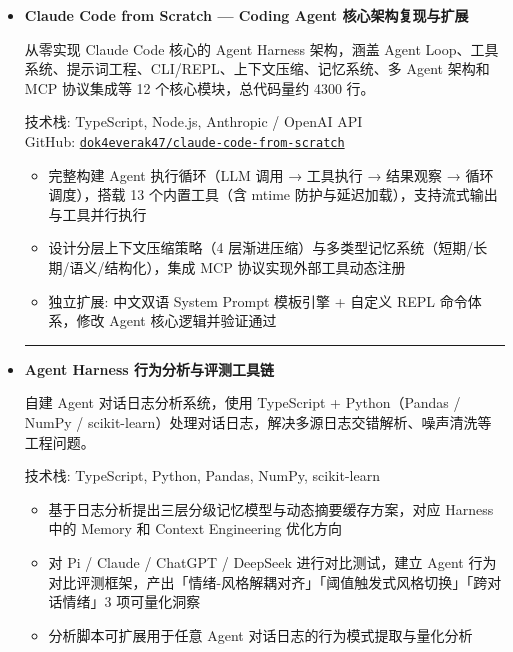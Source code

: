 \documentclass[zh]{resume}
\begin{document}
\begin{itemize}
    \item[\faCode] \textbf{Claude Code from Scratch — Coding Agent 核心架构复现与扩展}

    从零实现 Claude Code 核心的 Agent Harness 架构，涵盖 Agent Loop、工具系统、提示词工程、CLI/REPL、上下文压缩、记忆系统、多 Agent 架构和 MCP 协议集成等 12 个核心模块，总代码量约 4300 行。

    技术栈: TypeScript, Node.js, Anthropic / OpenAI API \\
    GitHub: \href{https://github.com/dok4everak47/claude-code-from-scratch}{\texttt{dok4everak47/claude-code-from-scratch}}
    \begin{itemize}
        \item 完整构建 Agent 执行循环（LLM 调用 → 工具执行 → 结果观察 → 循环调度），搭载 13 个内置工具（含 mtime 防护与延迟加载），支持流式输出与工具并行执行
        \item 设计分层上下文压缩策略（4 层渐进压缩）与多类型记忆系统（短期/长期/语义/结构化），集成 MCP 协议实现外部工具动态注册
        \item 独立扩展: 中文双语 System Prompt 模板引擎 + 自定义 REPL 命令体系，修改 Agent 核心逻辑并验证通过
    \end{itemize}

    \vspace{1ex}
    {\color{accentcolor!15}\hrule}
    \vspace{1ex}

    \item[\faCode] \textbf{Agent Harness 行为分析与评测工具链}

    自建 Agent 对话日志分析系统，使用 TypeScript + Python（Pandas / NumPy / scikit-learn）处理对话日志，解决多源日志交错解析、噪声清洗等工程问题。

    技术栈: TypeScript, Python, Pandas, NumPy, scikit-learn
    \begin{itemize}
        \item 基于日志分析提出三层分级记忆模型与动态摘要缓存方案，对应 Harness 中的 Memory 和 Context Engineering 优化方向
        \item 对 Pi / Claude / ChatGPT / DeepSeek 进行对比测试，建立 Agent 行为对比评测框架，产出「情绪-风格解耦对齐」「阈值触发式风格切换」「跨对话情绪」3 项可量化洞察
        \item 分析脚本可扩展用于任意 Agent 对话日志的行为模式提取与量化分析
    \end{itemize}
\end{itemize}
\end{document}
